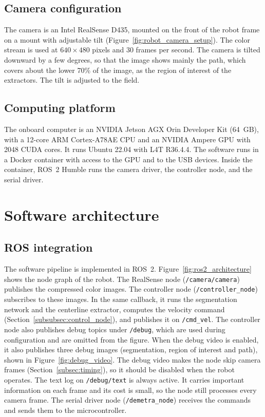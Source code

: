 \subsection{Camera configuration}
\label{subsec:camera}

The camera is an Intel RealSense D435, mounted on the front of the robot frame on a mount with adjustable tilt (Figure~\ref{fig:robot_camera_setup}). The color stream is used at $640 \times 480$ pixels and 30 frames per second. The camera is tilted downward by a few degrees, so that the image shows mainly the path, which covers about the lower 70\% of the image, as the region of interest of the extractors. The tilt is adjusted to the field.

\subsection{Computing platform}
\label{subsec:computing}

The onboard computer is an NVIDIA Jetson AGX Orin Developer Kit (64~GB), with a 12-core ARM Cortex-A78AE CPU and an NVIDIA Ampere GPU with 2048 CUDA cores. It runs Ubuntu 22.04 with L4T R36.4.4. The software runs in a Docker container with access to the GPU and to the USB devices. Inside the container, ROS~2 Humble runs the camera driver, the controller node, and the serial driver.

\section{Software architecture}
\label{sec:software}

\subsection{ROS integration}
\label{subsec:ros}

The software pipeline is implemented in ROS~2. Figure~\ref{fig:ros2_architecture} shows the node graph of the robot. The RealSense node (\texttt{/camera/camera}) publishes the compressed color images. The controller node (\texttt{/controller\_node}) subscribes to these images. In the same callback, it runs the segmentation network and the centerline extractor, computes the velocity command (Section~\ref{subsubsec:control_node}), and publishes it on \texttt{/cmd\_vel}. The controller node also publishes debug topics under \texttt{/debug}, which are used during configuration and are omitted from the figure. When the debug video is enabled, it also publishes three debug images (segmentation, region of interest and path), shown in Figure~\ref{fig:debug_video}. The debug video makes the node skip camera frames (Section~\ref{subsec:timing}), so it should be disabled when the robot operates. The text log on \texttt{/debug/text} is always active. It carries important information on each frame and its cost is small, so the node still processes every camera frame. The serial driver node (\texttt{/demetra\_node}) receives the commands and sends them to the microcontroller.

